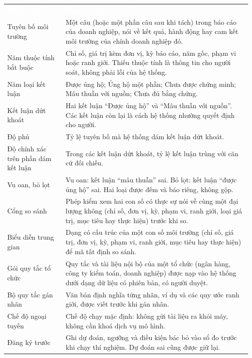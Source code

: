 \documentclass[12pt,a4paper,oneside]{report}
\newcommand{\thd}[1]{\textcolor{white}{\bfseries #1}}
\newcommand{\hdr}{\rowcolor{gsteal}}
\newcommand{\bangchu}{\small\linespread{1.08}\selectfont}
\begin{document}
{\bangchu
{}
\begin{tabularx}{\linewidth}{L{4.4cm}Y}
\hdr\thd{Thuật ngữ} & \thd{Nghĩa trong báo cáo này}\\
Tuyên bố môi trường & Một câu (hoặc một phần câu sau khi tách) trong báo cáo của doanh nghiệp, nói về kết quả, hành động hay cam kết môi trường của chính doanh nghiệp đó.\\
Năm thuộc tính bắt buộc & Chỉ số, giá trị kèm đơn vị, kỳ báo cáo, năm gốc, phạm vi hoặc ranh giới. Thiếu thuộc tính là thông tin cho người soát, không phải lỗi của hệ thống.\\
Năm loại kết luận & Được ủng hộ; Ủng hộ một phần; Chưa được chứng minh; Mâu thuẫn với nguồn; Chưa đủ bằng chứng.\\
Kết luận dứt khoát & Hai kết luận “Được ủng hộ” và “Mâu thuẫn với nguồn”. Các kết luận còn lại là cách hệ thống nhường quyết định cho người.\\
Độ phủ & Tỷ lệ tuyên bố mà hệ thống dám kết luận dứt khoát.\\
Độ chính xác trên phần dám kết luận & Trong các kết luận dứt khoát, tỷ lệ kết luận trùng với căn cứ đối chiếu.\\
Vu oan, bỏ lọt & Vu oan: kết luận “mâu thuẫn” sai. Bỏ lọt: kết luận “được ủng hộ” sai. Hai loại được đếm và báo riêng, không gộp.\\
Cổng so sánh & Phép kiểm xem hai con số có thực sự nói về cùng một đại lượng không (chỉ số, đơn vị, kỳ, phạm vi, ranh giới, loại giá trị, mục tiêu hay thực hiện) trước khi so.\\
Biểu diễn trung gian & Dạng có cấu trúc của một con số môi trường (chỉ số, giá trị, đơn vị, kỳ, phạm vi, ranh giới, mục tiêu hay thực hiện) để mã tất định so sánh.\\
Gói quy tắc tổ chức & Quy tắc và tài liệu nội bộ của một tổ chức (ngân hàng, công ty kiểm toán, doanh nghiệp) được nạp vào hệ thống dưới dạng dữ liệu có phiên bản, có người duyệt.\\
Bộ quy tắc gán nhãn & Văn bản định nghĩa từng nhãn, ví dụ và các quy ước ranh giới, được viết trước khi gán nhãn.\\
Chế độ ngoại tuyến & Chế độ chạy mặc định: không gửi tài liệu ra khỏi máy, không cần khoá dịch vụ mô hình.\\
Đăng ký trước & Ghi dự đoán, ngưỡng và điều kiện bác bỏ vào sổ đo trước khi chạy thí nghiệm. Dự đoán sai cũng được giữ lại.\\
\end{tabularx}}
\end{document}

